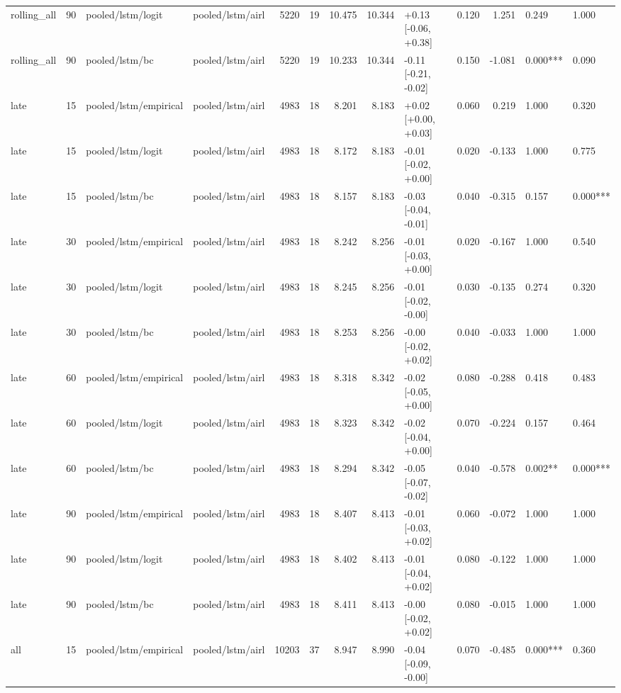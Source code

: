 \begin{tabular}{lrllrrrrlrrll}
rolling_all & 90 & pooled/lstm/logit & pooled/lstm/airl & 5220 & 19 & 10.475 & 10.344 & +0.13 [-0.06, +0.38] & 0.120 & 1.251 & 0.249 & 1.000 \\
rolling_all & 90 & pooled/lstm/bc & pooled/lstm/airl & 5220 & 19 & 10.233 & 10.344 & -0.11 [-0.21, -0.02] & 0.150 & -1.081 & 0.000*** & 0.090 \\
late & 15 & pooled/lstm/empirical & pooled/lstm/airl & 4983 & 18 & 8.201 & 8.183 & +0.02 [+0.00, +0.03] & 0.060 & 0.219 & 1.000 & 0.320 \\
late & 15 & pooled/lstm/logit & pooled/lstm/airl & 4983 & 18 & 8.172 & 8.183 & -0.01 [-0.02, +0.00] & 0.020 & -0.133 & 1.000 & 0.775 \\
late & 15 & pooled/lstm/bc & pooled/lstm/airl & 4983 & 18 & 8.157 & 8.183 & -0.03 [-0.04, -0.01] & 0.040 & -0.315 & 0.157 & 0.000*** \\
late & 30 & pooled/lstm/empirical & pooled/lstm/airl & 4983 & 18 & 8.242 & 8.256 & -0.01 [-0.03, +0.00] & 0.020 & -0.167 & 1.000 & 0.540 \\
late & 30 & pooled/lstm/logit & pooled/lstm/airl & 4983 & 18 & 8.245 & 8.256 & -0.01 [-0.02, -0.00] & 0.030 & -0.135 & 0.274 & 0.320 \\
late & 30 & pooled/lstm/bc & pooled/lstm/airl & 4983 & 18 & 8.253 & 8.256 & -0.00 [-0.02, +0.02] & 0.040 & -0.033 & 1.000 & 1.000 \\
late & 60 & pooled/lstm/empirical & pooled/lstm/airl & 4983 & 18 & 8.318 & 8.342 & -0.02 [-0.05, +0.00] & 0.080 & -0.288 & 0.418 & 0.483 \\
late & 60 & pooled/lstm/logit & pooled/lstm/airl & 4983 & 18 & 8.323 & 8.342 & -0.02 [-0.04, +0.00] & 0.070 & -0.224 & 0.157 & 0.464 \\
late & 60 & pooled/lstm/bc & pooled/lstm/airl & 4983 & 18 & 8.294 & 8.342 & -0.05 [-0.07, -0.02] & 0.040 & -0.578 & 0.002** & 0.000*** \\
late & 90 & pooled/lstm/empirical & pooled/lstm/airl & 4983 & 18 & 8.407 & 8.413 & -0.01 [-0.03, +0.02] & 0.060 & -0.072 & 1.000 & 1.000 \\
late & 90 & pooled/lstm/logit & pooled/lstm/airl & 4983 & 18 & 8.402 & 8.413 & -0.01 [-0.04, +0.02] & 0.080 & -0.122 & 1.000 & 1.000 \\
late & 90 & pooled/lstm/bc & pooled/lstm/airl & 4983 & 18 & 8.411 & 8.413 & -0.00 [-0.02, +0.02] & 0.080 & -0.015 & 1.000 & 1.000 \\
all & 15 & pooled/lstm/empirical & pooled/lstm/airl & 10203 & 37 & 8.947 & 8.990 & -0.04 [-0.09, -0.00] & 0.070 & -0.485 & 0.000*** & 0.360 \\

\end{tabular}
